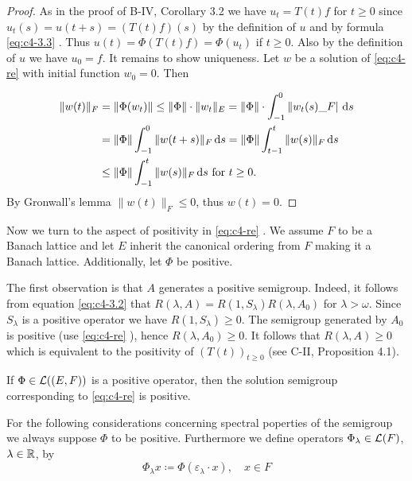 \begin{proof}
As in the proof of B-IV, Corollary 3.2 we have $u_t = T(t)f$ for $t \geq 0$ since $u_t(s) = u(t+s) = (T(t)f)(s)$ by the definition of $u$ and by formula \eqref{eq:c4-3.3} .
Thus $u(t) = \Phi(T(t)f) = \Phi(u_t)$ if $t \geq 0$.
Also by the definition of $u$ we have $u_{0} = f$.
It remains to show uniqueness.
Let $w$ be a solution of \eqref{eq:c4-re} with initial function $w_{0} = 0$.
Then

\begin{align*}
\|w(t)\|_F &= \|\Phi(w_{t})\| \leq \|\Phi\| \cdot  \|w_{t}\|_{E} =  \|\Phi\| \cdot \int_{-1}^{0} \|w_{t}(s)\_{F}| \, \mathop{}\!\mathrm{d}{s} \\
&=  \|\Phi\| \int_{-1}^0 \|w(t+s)\|_{F} \mathop{}\!\mathrm{d}{s} = \|\Phi\| \int_{t-1}^{t} \|w(s)\|_{F} \mathop{}\!\mathrm{d}{s} \\
&\leq \|\Phi\| \int_{-1}^{t} \|w(s)\|_{F} \mathop{}\!\mathrm{d}{s}  \text{ for } t \geq 0.
\end{align*}
By Gronwall's lemma $\|w(t)\|_F \leq 0$, thus $w(t) = 0$.
\end{proof}

Now we turn to the aspect of positivity in \eqref{eq:c4-re} . We assume $F$ to be a Banach lattice and let $E$ inherit the canonical ordering from $F$ making it a Banach lattice. Additionally, let $\Phi$ be positive.

The first observation is that $A$ generates a positive semigroup.
Indeed, it follows from equation \eqref{eq:c4-3.2} that $R(\lambda,A) = R(1,S_\lambda)R(\lambda,A_{0})$ for $\lambda > \omega$. Since $S_\lambda$ is a positive operator we have $R(1,S_\lambda) \geq 0$.
The semigroup generated by $A_{0}$ is positive (use \eqref{eq:c4-re} ), hence $R(\lambda,A_{0}) \geq 0$.
It follows that $R(\lambda,A) \geq 0$ which is equivalent to the positivity of $(T(t))_{t \geq 0}$ (see C-II, Proposition 4.1).

\begin{proposition}\label{prop:c4-3.3}
If $\Phi \in \mathcal{L}((E,F))$ is a positive operator, then the solution semigroup corresponding to \eqref{eq:c4-re} is positive.
\end{proposition}

For the following considerations concerning spectral poperties of the semigroup we always suppose $\Phi$ to be positive. Furthermore we define operators $\Phi_{\lambda} \in \mathcal{L}(F)$, $\lambda \in \mathbb{R}$, by
\begin{equation}\label{eq:c4-3.6}
\Phi_\lambda x \coloneqq \Phi(\varepsilon_{\lambda} \cdot x), \quad x \in F
\end{equation}

